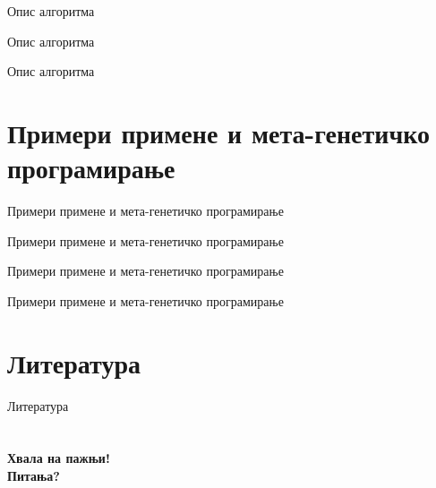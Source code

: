 \documentclass{beamer}
\begin{document}
    \begin{frame}{Опис алгоритма}
    \end{frame}

    \begin{frame}{Опис алгоритма}
    \end{frame}
    
    \begin{frame}{Опис алгоритма}
    \end{frame}

\section{Примери примене и мета-генетичко програмирање}

    \begin{frame}{Примери примене и мета-генетичко програмирање}
    \end{frame}

    \begin{frame}{Примери примене и мета-генетичко програмирање}
    \end{frame}

    \begin{frame}{Примери примене и мета-генетичко програмирање}
    \end{frame}
    
    \begin{frame}{Примери примене и мета-генетичко програмирање}
    \end{frame}
    
\section{Литература}
    \nocite{*}
    \begin{frame}{Литература}
        \printbibliography
    \end{frame}
    
\section{}
\begin{frame}{}
    \centering
        \Huge\bfseries{Хвала на пажњи!\\ Питања?}
\end{frame}
\end{document}
